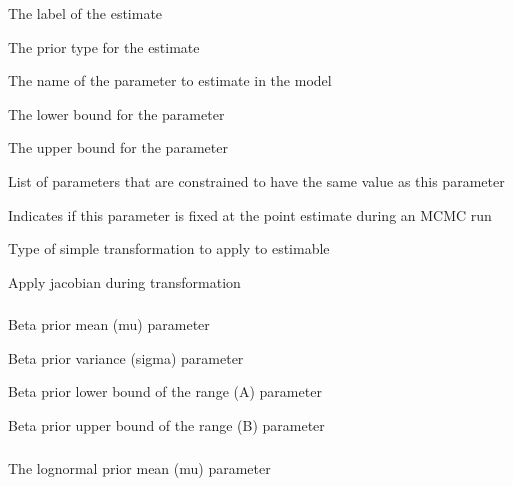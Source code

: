 
 {The label of the estimate}

 {The prior type for the estimate}

 {The name of the parameter to estimate in the model}

 {The lower bound for the parameter}

 {The upper bound for the parameter}

 {List of parameters that are constrained to have the same value as this parameter}

 {Indicates if this parameter is fixed at the point estimate during an MCMC run}

 {Type of simple transformation to apply to estimable}

 {Apply jacobian during transformation}

\subsubsection[Beta]{}

 {Beta prior  mean (mu) parameter}

 {Beta prior variance (sigma) parameter}

 {Beta prior lower bound of the range (A) parameter}

 {Beta prior upper bound of the range (B) parameter}

\subsubsection[Lognormal]{}

 {The lognormal prior mean (mu) parameter}

